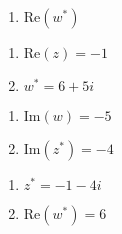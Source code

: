 \documentclass[11pt,a4paper]{book}
\begin{document}
\begin{example}
\begin{minipage}[t]{0.33\textwidth}
\begin{enumerate}[label=(\alph*),start=3]
\addtocounter{enumi}{2}

\item  $\text{Re}\left(w^{*}\right)$

\end{enumerate}

\end{minipage}

\medskip{}

\Solution

\begin{minipage}[t]{0.33\textwidth}

\begin{enumerate}[label=(\alph*)]

\item  $\text{Re}\left(z\right)=-1$

\addtocounter{enumi}{2}

\item  $w^{*}=6+5i$

\end{enumerate}

\end{minipage}
\begin{minipage}[t]{0.33\textwidth}

\begin{enumerate}[label=(\alph*),start=2]

\item  $\text{Im}\left(w\right)=-5$

\addtocounter{enumi}{2}

\item  $\text{Im}\left(z^{*}\right)=-4$

\end{enumerate}

\end{minipage}
\begin{minipage}[t]{0.33\textwidth}

\begin{enumerate}[label=(\alph*),start=3]

\item  $z^{*}=-1-4i$

\addtocounter{enumi}{2}

\item  $\text{Re}\left(w^{*}\right)=6$

\end{enumerate}

\end{minipage}

\end{example}
\end{document}
